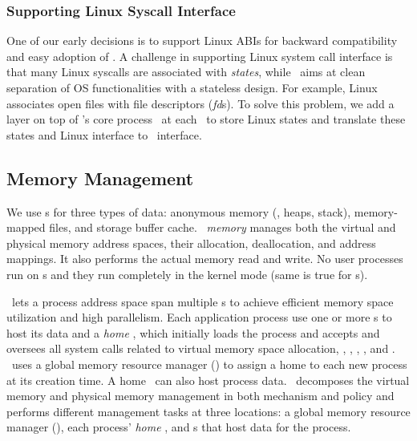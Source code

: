 \documentclass[10pt,times,twocolumn]{z2-article}
\begin{document}
{{{{{{{%

\subsubsection{Supporting Linux Syscall Interface}
One of our early decisions is to support Linux ABIs for backward compatibility
and easy adoption of \lego.
A challenge in supporting Linux system call interface is that 
many Linux syscalls are associated with {\em states},
while \lego\ aims at clean separation of OS functionalities with a stateless design.
For example, Linux associates open files with file descriptors ({\em fd}s).
To solve this problem, we add a layer on top of \lego's core process \microos\ at each \pcomponent\ to store Linux states
and translate these states and Linux interface to \lego\ interface.


\subsection{Memory Management}
We use \mcomponent{}s for three types of data:
anonymous memory (\ie, heaps, stack), 
memory-mapped files, and storage buffer cache.
\lego\ {\em memory \microos{}}
manages both the virtual and physical memory address spaces,
their allocation, deallocation, and address mappings.
It also performs the actual memory read and write.
No user processes run on \mcomponent{}s 
and they run completely in the kernel mode
(same is true for \scomponent{}s). 

\lego\ lets a process address space span multiple \mcomponent{}s
to achieve efficient memory space utilization and high parallelism.
Each application process use one or more \mcomponent{}s to host its data
and a {\em home \mcomponent},
which initially loads the process
and accepts and oversees all system calls related to virtual memory space allocation, 
\eg, \brk, \mmap, \munmap, and \mremap.
\lego\ uses a global memory resource manager ({\em \gmm}) to assign a home \mcomponent{} to each new process at its creation time.
A home \mcomponent\ can also host process data.
\lego\ decomposes the virtual memory and physical memory management
in both mechanism and policy
and performs different management tasks at three locations:
a global memory resource manager ({\em \gmm}),
each process' {\em home} \mcomponent,
and \mcomponent{}s that host data for the process.
\fi

}}}}}}}
\end{document}
